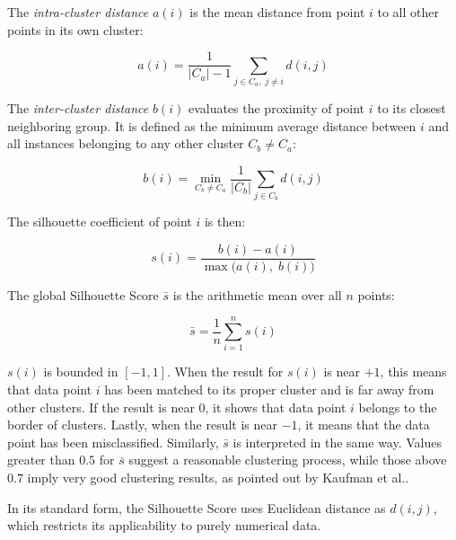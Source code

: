 \vspace{1em}

The \emph{intra-cluster distance} $a(i)$ is the mean distance from point $i$ to all other points in its own cluster:

\begin{equation}
    a(i) = \frac{1}{|C_a| - 1} \sum_{j \in C_a,\; j \neq i} d(i, j)
    \label{eq:silhouette_a}
\end{equation}

\vspace {1em}

The \emph{inter-cluster distance} $b(i)$ evaluates the proximity of point $i$ to its closest neighboring group. It is defined as the minimum average distance between $i$ and all instances belonging to any other cluster $C_b \neq C_a$:

\begin{equation}
    b(i) = \min_{C_b \neq C_a} \frac{1}{|C_b|} \sum_{j \in C_b} d(i, j)
    \label{eq:silhouette_b}
\end{equation}

The silhouette coefficient of point $i$ is then:

\begin{equation}
    s(i) = \frac{b(i) - a(i)}{\max\bigl(a(i),\; b(i)\bigr)}
    \label{eq:silhouette_si}
\end{equation}

The global Silhouette Score $\bar{s}$ is the arithmetic mean over all $n$ points:

\begin{equation}
    \bar{s} = \frac{1}{n} \sum_{i=1}^{n} s(i)
    \label{eq:silhouette_global}
\end{equation}

$s(i)$ is bounded in $[-1, 1]$. When the result for $s(i)$ is near $+1$, this means that data point $i$ has been matched to its proper cluster and is far away from other clusters. If the result is near $0$, it shows that data point $i$ belongs to the border of clusters. Lastly, when the result is near $-1$, it means that the data point has been misclassified. Similarly, $\bar{s}$ is interpreted in the same way. Values greater than $0.5$ for $\bar{s}$ suggest a reasonable clustering process, while those above $0.7$ imply very good clustering results, as pointed out by Kaufman et al.\cite{kaufman1990}.

In its standard form, the Silhouette Score uses Euclidean distance as $d(i,j)$, which restricts its applicability to purely numerical data.

